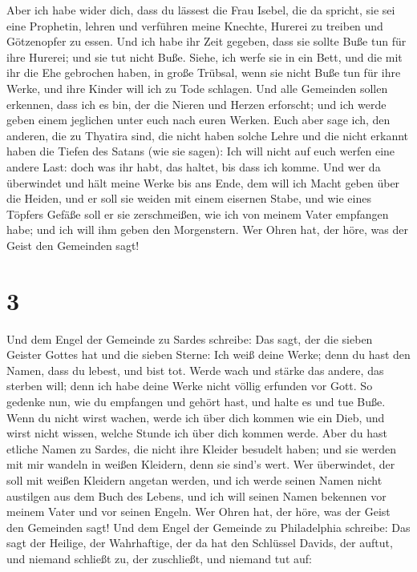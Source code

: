 Aber ich habe wider dich, dass du lässest die Frau
Isebel, die da spricht, sie sei eine Prophetin, lehren und verführen
meine Knechte, Hurerei zu treiben und Götzenopfer zu essen.
 Und ich habe ihr Zeit gegeben, dass sie sollte Buße tun
für ihre Hurerei; und sie tut nicht Buße.  Siehe, ich
werfe sie in ein Bett, und die mit ihr die Ehe gebrochen haben, in große
Trübsal, wenn sie nicht Buße tun für ihre Werke,  und
ihre Kinder will ich zu Tode schlagen. Und alle Gemeinden sollen
erkennen, dass ich es bin, der die Nieren und Herzen erforscht; und ich
werde geben einem jeglichen unter euch nach euren Werken.
 Euch aber sage ich, den anderen, die zu Thyatira sind,
die nicht haben solche Lehre und die nicht erkannt haben die Tiefen des
Satans (wie sie sagen): Ich will nicht auf euch werfen eine andere Last:
 doch was ihr habt, das haltet, bis dass ich komme.
 Und wer da überwindet und hält meine Werke bis ans Ende,
dem will ich Macht geben über die Heiden,  und er soll
sie weiden mit einem eisernen Stabe, und wie eines Töpfers Gefäße soll
er sie zerschmeißen,  wie ich von meinem Vater empfangen
habe; und ich will ihm geben den Morgenstern.  Wer Ohren
hat, der höre, was der Geist den Gemeinden sagt!

\hypertarget{section-2}{%
\section{3}\label{section-2}}

 Und dem Engel der Gemeinde zu Sardes schreibe: Das sagt,
der die sieben Geister Gottes hat und die sieben Sterne: Ich weiß deine
Werke; denn du hast den Namen, dass du lebest, und bist tot.
 Werde wach und stärke das andere, das sterben will; denn
ich habe deine Werke nicht völlig erfunden vor Gott.  So
gedenke nun, wie du empfangen und gehört hast, und halte es und tue
Buße. Wenn du nicht wirst wachen, werde ich über dich kommen wie ein
Dieb, und wirst nicht wissen, welche Stunde ich über dich kommen werde.
 Aber du hast etliche Namen zu Sardes, die nicht ihre
Kleider besudelt haben; und sie werden mit mir wandeln in weißen
Kleidern, denn sie sind's wert.  Wer überwindet, der soll
mit weißen Kleidern angetan werden, und ich werde seinen Namen nicht
austilgen aus dem Buch des Lebens, und ich will seinen Namen bekennen
vor meinem Vater und vor seinen Engeln.  Wer Ohren hat,
der höre, was der Geist den Gemeinden sagt!  Und dem Engel
der Gemeinde zu Philadelphia schreibe: Das sagt der Heilige, der
Wahrhaftige, der da hat den Schlüssel Davids, der auftut, und niemand
schließt zu, der zuschließt, und niemand tut auf:

